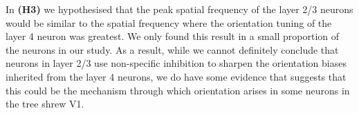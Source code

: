 In \textbf{(H3)} we hypothesised that the peak spatial frequency of the
layer 2/3 neurons would be similar to the spatial frequency where the
orientation tuning of the layer 4 neuron was greatest. We only found
this result in a small proportion of the neurons in our study. As a
result, while we cannot definitely conclude that neurons in layer 2/3
use non-specific inhibition to sharpen the orientation biases inherited
from the layer 4 neurons, we do have some evidence that suggests that
this could be the mechanism through which orientation arises in some
neurons in the tree shrew V1.
